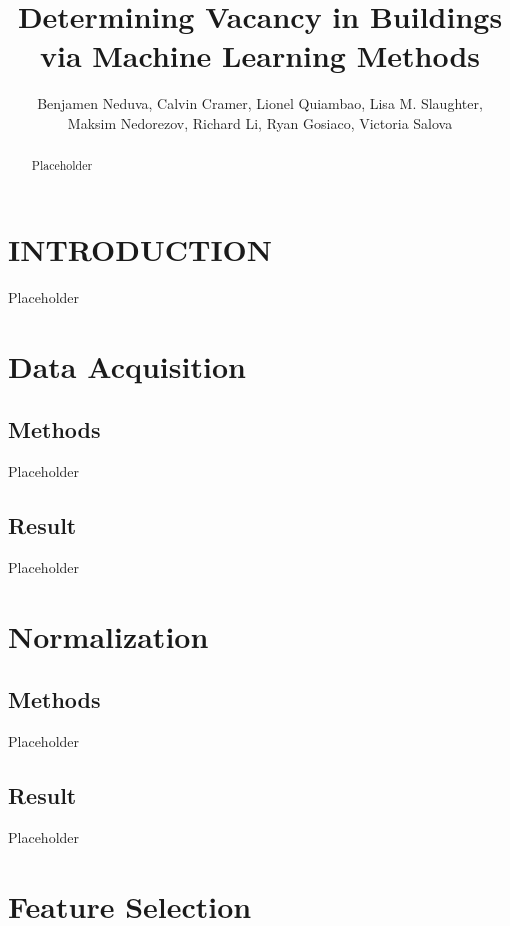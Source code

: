 \documentclass[letterpaper, 12 pt, conference]{ieeeconf}  %
\title{\LARGE \bf
Determining Vacancy in Buildings via Machine Learning Methods
}
\author{Benjamen Neduva, Calvin Cramer, Lionel Quiambao, Lisa M. Slaughter, \\
        Maksim Nedorezov, Richard Li, Ryan Gosiaco, Victoria Salova}
\begin{document}
\maketitle
\thispagestyle{empty}
\pagestyle{empty}


\begin{abstract}

Placeholder

\end{abstract}


\section{INTRODUCTION}

Placeholder

\section{Data Acquisition}
\subsection{Methods}

Placeholder

\subsection{Result}

Placeholder

\section{Normalization}
\subsection{Methods}

Placeholder

\subsection{Result}

Placeholder

\section{Feature Selection}
\end{document}
